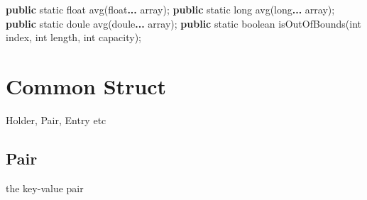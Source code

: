 \documentclass[
]{book}
\newenvironment{Shaded}{\begin{snugshade}}{\end{snugshade}}
\newcommand{\DataTypeTok}[1]{\textcolor[rgb]{0.13,0.29,0.53}{#1}}
\newcommand{\FunctionTok}[1]{\textcolor[rgb]{0.00,0.00,0.00}{#1}}
\newcommand{\KeywordTok}[1]{\textcolor[rgb]{0.13,0.29,0.53}{\textbf{#1}}}
\newcommand{\NormalTok}[1]{#1}
\begin{document}
\begin{Shaded}
\begin{Highlighting}[]
\KeywordTok{public} \DataTypeTok{static} \DataTypeTok{float} \FunctionTok{avg}\NormalTok{(}\DataTypeTok{float}\KeywordTok{... }\NormalTok{array);}
\KeywordTok{public} \DataTypeTok{static} \DataTypeTok{long} \FunctionTok{avg}\NormalTok{(}\DataTypeTok{long}\KeywordTok{... }\NormalTok{array);}
\KeywordTok{public} \DataTypeTok{static}\NormalTok{ doule }\FunctionTok{avg}\NormalTok{(doule}\KeywordTok{... }\NormalTok{array);}
\KeywordTok{public} \DataTypeTok{static} \DataTypeTok{boolean} \FunctionTok{isOutOfBounds}\NormalTok{(}\DataTypeTok{int}\NormalTok{ index, }\DataTypeTok{int}\NormalTok{ length, }\DataTypeTok{int}\NormalTok{ capacity);}
\end{Highlighting}
\end{Shaded}

\hypertarget{langx-java_references_package_Struct}{%
\chapter{Common Struct}\label{langx-java_references_package_Struct}}

Holder, Pair, Entry etc

\hypertarget{langx-java_references_struct_Pair}{%
\section{Pair}\label{langx-java_references_struct_Pair}}

the key-value pair
\end{document}
